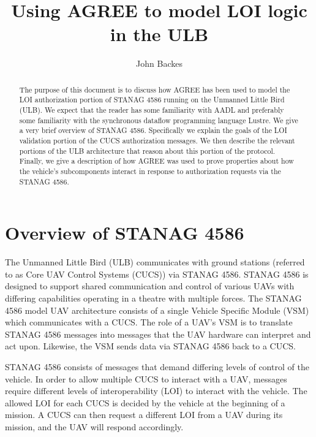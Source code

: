 \documentclass{llncs}
\begin{document}
%
%
\pagestyle{plain}  %
%

\title{Using AGREE to model LOI logic in the ULB}
\author{John Backes}
\maketitle
\begin{abstract}
The purpose of this document is to discuss how AGREE has been used to model the LOI authorization portion of STANAG 4586 running on the Unmanned Little Bird (ULB).  We expect that the reader has some familiarity with AADL and preferably some familiarity with the  synchronous dataflow programming language Lustre.  We give a very brief overview of STANAG 4586.  Specifically we explain the goals of the LOI validation portion of the CUCS authorization messages.  We then describe the relevant portions of the ULB architecture that reason about this portion of the protocol.  Finally, we give a description of how AGREE was used to prove properties about how the vehicle's subcomponents interact in response to authorization requests via the STANAG 4586.
\end{abstract}

\section{Overview of STANAG 4586}
The Unmanned Little Bird (ULB) communicates with ground stations (referred to as Core UAV Control Systems (CUCS)) via STANAG 4586.  STANAG 4586 is designed to support shared communication and control of various UAVs with differing capabilities operating in a theatre with multiple forces. The STANAG 4586 model UAV architecture consists of a single Vehicle Specific Module (VSM) which communicates with a CUCS.  The role of a UAV's VSM is to translate STANAG 4586 messages into messages that the UAV hardware can interpret and act upon.  Likewise, the VSM sends data via STANAG 4586 back to a CUCS.

STANAG 4586 consists of messages that demand differing levels of control of the vehicle. In order to allow multiple CUCS to interact with a UAV, messages require different levels of interoperability (LOI) to interact with the vehicle. The allowed LOI for each CUCS is decided by the vehicle at the beginning of a mission.  A CUCS can then request a different LOI from a UAV during its mission, and the UAV will respond accordingly. 
\end{document}
